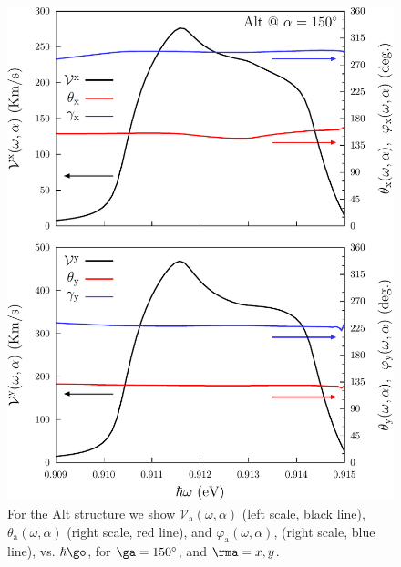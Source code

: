 \documentclass[prb,11pt,tightenlines,twocolumn,aps]{revtex4-1}
\begin{document}
\begin{figure}[tb]
\centering
\includegraphics[width=\linewidth]{altplots/alt-vx-vy-w2}
\caption{For the Alt structure we show $\mathcal{V}_{\mathrm{a}}
(\omega,\alpha)$ (left scale, black line), $\theta_{\mathrm{a}}
(\omega,\alpha)$ (right scale, red line), and $\varphi_{\mathrm{a}}
(\omega,\alpha)$, (right scale, blue line), vs. $\hbar\go$, for
$\ga=150^\circ$, and $\rma=x,y$. }
\label{fig:alt-vx-vy-w2}
\end{figure}
\end{document}
